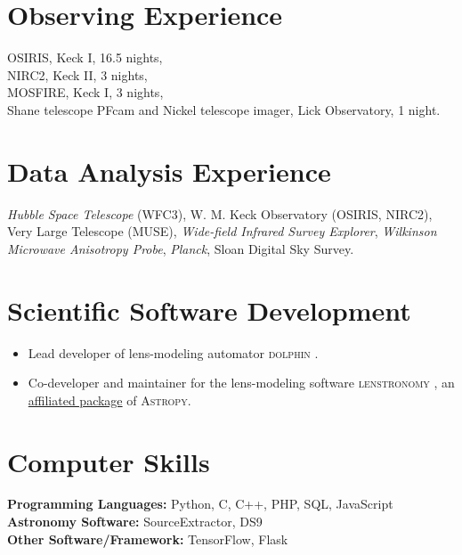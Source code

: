 \documentclass[margin, line]{res}
\newenvironment{list2}{
  \begin{list}{$\bullet$}{%
      \setlength{\itemsep}{0in}
      \setlength{\parsep}{0in} \setlength{\parskip}{0in}
      \setlength{\topsep}{0in} \setlength{\partopsep}{0in} 
      \setlength{\leftmargin}{0.2in}}}{\end{list}}
\begin{document}
\begin{resume}
\section{\sc Observing Experience}
OSIRIS, Keck I, 16.5 nights,\\
NIRC2, Keck II, 3 nights, \\
MOSFIRE, Keck I, 3 nights, \\
Shane telescope PFcam and Nickel telescope imager, Lick Observatory, 1 night.


\section{\sc Data Analysis Experience}
\textit{Hubble Space Telescope} (WFC3), 
W. M. Keck Observatory (OSIRIS, NIRC2),
Very Large Telescope (MUSE),
{\it Wide-field Infrared Survey Explorer},
{\it Wilkinson Microwave Anisotropy Probe},
{\it Planck},
Sloan Digital Sky Survey.

\section{\sc Scientific Software Development} 
\begin{itemize}
	\item Lead developer of lens-modeling automator \textsc{dolphin} \href{https://github.com/ajshajib/dolphin}{\faGithub}.
	\item Co-developer and maintainer for the lens-modeling software \textsc{lenstronomy} \href{https://github.com/lenstronomy/lenstronomy}{\faGithub}, an \href{https://www.astropy.org/affiliated/index.html}{affiliated package} of \textsc{Astropy}.
\end{itemize}

\section{\sc Computer Skills} 
\textbf{Programming Languages:} Python, C, C++, PHP, SQL, JavaScript \\
\textbf{Astronomy Software:} SourceExtractor, DS9 \\
\textbf{Other Software/Framework:} TensorFlow, Flask



\end{resume}
\end{document}

